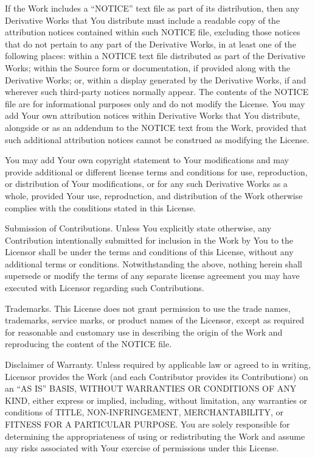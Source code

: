 \documentclass{article}
\begin{document}
    If the Work includes a ``NOTICE'' text file as part of its
    distribution, then any Derivative Works that You distribute must
    include a readable copy of the attribution notices contained within
    such NOTICE file, excluding those notices that do not pertain to
    any part of the Derivative Works, in at least one of the following
    places: within a NOTICE text file distributed as part of the
    Derivative Works; within the Source form or documentation, if
    provided along with the Derivative Works; or, within a display
    generated by the Derivative Works, if and wherever such third-party
    notices normally appear. The contents of the NOTICE file are for
    informational purposes only and do not modify the License. You may
    add Your own attribution notices within Derivative Works that You
    distribute, alongside or as an addendum to the NOTICE text from the
    Work, provided that such additional attribution notices cannot be
    construed as modifying the License.

  You may add Your own copyright statement to Your modifications and
  may provide additional or different license terms and conditions
  for use, reproduction, or distribution of Your modifications, or
  for any such Derivative Works as a whole, provided Your use,
  reproduction, and distribution of the Work otherwise complies with
  the conditions stated in this License.

  Submission of Contributions. Unless You explicitly state otherwise,
  any Contribution intentionally submitted for inclusion in the Work
  by You to the Licensor shall be under the terms and conditions of
  this License, without any additional terms or conditions.
  Notwithstanding the above, nothing herein shall supersede or modify
  the terms of any separate license agreement you may have executed
  with Licensor regarding such Contributions.

  Trademarks. This License does not grant permission to use the trade
  names, trademarks, service marks, or product names of the Licensor,
  except as required for reasonable and customary use in describing
  the origin of the Work and reproducing the content of the NOTICE
  file.

  Disclaimer of Warranty. Unless required by applicable law or agreed
  to in writing, Licensor provides the Work (and each Contributor
  provides its Contributions) on an ``AS IS'' BASIS, WITHOUT
  WARRANTIES OR CONDITIONS OF ANY KIND, either express or implied,
  including, without limitation, any warranties or conditions of
  TITLE, NON-INFRINGEMENT, MERCHANTABILITY, or FITNESS FOR A
  PARTICULAR PURPOSE. You are solely responsible for determining the
  appropriateness of using or redistributing the Work and assume any
  risks associated with Your exercise of permissions under this
  License.
\end{document}
